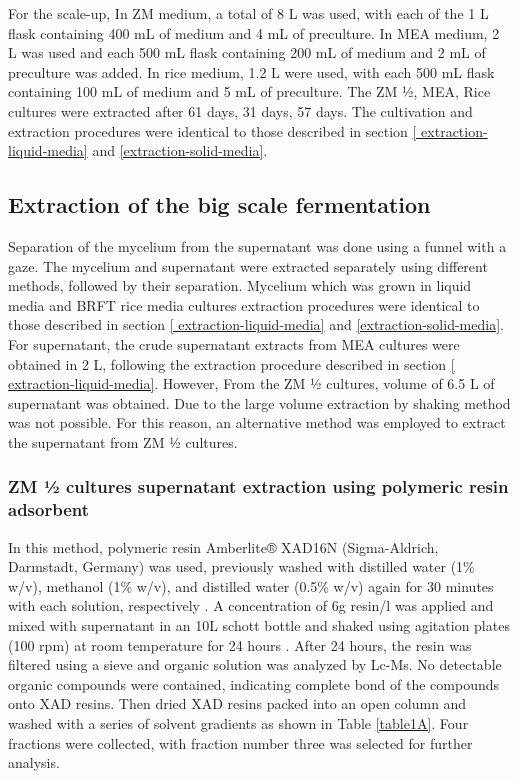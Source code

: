 For the scale-up, In ZM medium, a total of 8 L was used, with each of the 1 L flask containing 400 mL of medium and 4 mL of preculture. In MEA medium, 2 L was used and  each 500 mL flask containing 200 mL of medium and 2 mL of preculture was added. In rice medium, 1.2 L were used, with each 500 mL flask containing 100 mL of medium and 5 mL of preculture. The ZM ½, MEA, Rice cultures were extracted after 61 days, 31 days, 57 days. The cultivation and extraction procedures were identical to those described in section  \ref{ extraction-liquid-media} and \ref{extraction-solid-media}.


\subsection{Extraction of the big scale fermentation}
Separation of the mycelium from the supernatant was done using a funnel with a gaze. The mycelium and supernatant were extracted separately using different methods, followed by their separation. Mycelium which was grown in liquid media and BRFT rice media cultures extraction procedures were identical to those described in section \ref{ extraction-liquid-media} and \ref{extraction-solid-media}.\\

For supernatant, the crude supernatant extracts from MEA cultures were obtained in 2 L, following the extraction procedure described in section \ref{ extraction-liquid-media}. However, From the ZM ½  cultures, volume of 6.5 L of supernatant was obtained. Due to the large volume extraction by shaking method was not possible. For this reason, an alternative method was employed to extract the supernatant from ZM ½ cultures.\\

\subsubsection{ZM ½  cultures supernatant extraction using polymeric resin adsorbent}
In this method, polymeric resin Amberlite® XAD16N (Sigma-Aldrich, Darmstadt, Germany) was used, previously washed with distilled water (1\% w/v), methanol (1\% w/v), and distilled water (0.5\% w/v) again for 30 minutes with each solution, respectively \cite{CharriaGirn2021}. A concentration of 6g resin/l was applied and mixed with supernatant in an 10L schott bottle and shaked using agitation plates (100 rpm) at room temperature for 24 hours \cite{Caicedo2010}. After 24 hours, the resin was filtered using a sieve and organic solution was analyzed by Lc-Ms. No detectable organic compounds were contained, indicating complete bond of the compounds onto XAD resins. Then dried XAD resins packed into an open column and washed with a series of solvent gradients as shown in Table \ref{table1A}. Four fractions were collected, with fraction number three was selected for further analysis.\\

